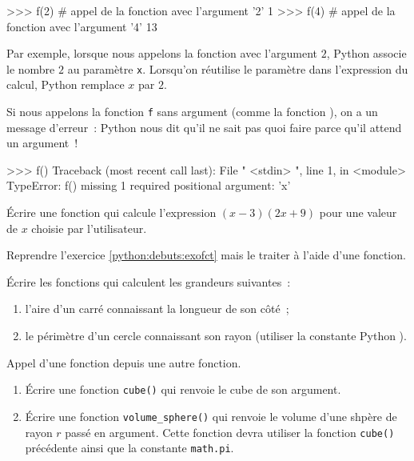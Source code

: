 \begin{pythoncode}
>>> f(2)                      # appel de la fonction avec l'argument '2'
1
>>> f(4)                      # appel de la fonction avec l'argument '4'
13
\end{pythoncode}

Par exemple, lorsque nous appelons la fonction avec l'argument $2$, Python associe le nombre $2$
au paramètre \texttt{x}. Lorsqu'on réutilise le paramètre dans l'expression du calcul,
Python remplace $x$ par $2$.

Si nous appelons la fonction \texttt{f} sans argument (comme la fonction ), on a
un message d'erreur~: Python nous dit qu'il ne sait pas quoi faire parce qu'il attend un argument~!

\begin{pythoncode}
>>> f()
Traceback (most recent call last):
  File " <stdin> ", line 1, in <module>
TypeError: f() missing 1 required positional argument: 'x'
\end{pythoncode}

\begin{exercice}
Écrire une fonction qui calcule l'expression $(x-3)(2x+9)$ pour une valeur de $x$ choisie par l'utilisateur.
\end{exercice}

\begin{exercice}
Reprendre l'exercice \ref{python:debuts:exofct} mais le traiter à l'aide d'une fonction.
\end{exercice}

\begin{exercice}
Écrire les fonctions qui calculent les grandeurs suivantes~:
\begin{enumerate}
	\item l'aire d'un carré connaissant la longueur de son côté~;
	\item le périmètre d'un cercle connaissant son rayon (utiliser la constante Python
	).
\end{enumerate}
\end{exercice}

\begin{exercice}\label{python:fonctions:exos:sphere}
Appel d'une fonction depuis une autre fonction.
\begin{enumerate}
	\item Écrire une fonction \texttt{cube()} qui renvoie le cube de son argument.
	\item Écrire une fonction \texttt{volume\_sphere()} qui renvoie le volume d'une shpère
	de rayon $r$ passé en argument. Cette fonction devra utiliser la fonction \texttt{cube()}
	précédente ainsi que la constante \texttt{math.pi}.
\end{enumerate}
\end{exercice}

